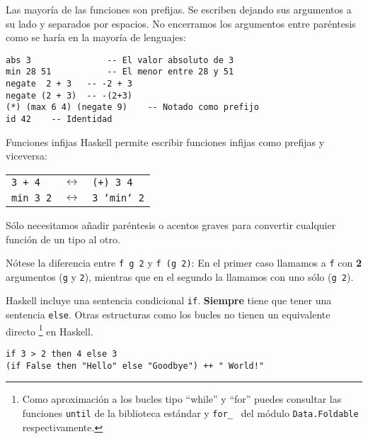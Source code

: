 Las mayoría de las funciones son prefijas. Se escriben dejando sus argumentos a
su lado y separados por espacios. No encerramos los argumentos entre paréntesis
como se haría en la mayoría de lenguajes:

\begin{lstlisting}
abs 3				-- El valor absoluto de 3
min 28 51			-- El menor entre 28 y 51
negate  2 + 3   -- -2 + 3
negate (2 + 3)  -- -(2+3)
(*) (max 6 4) (negate 9)	-- Notado como prefijo
id 42	 -- Identidad
\end{lstlisting}

\begin{extra}{Funciones infijas}
Haskell permite escribir funciones infijas como prefijas y viceversa:

\espacio

\begin{tabular}{lcl}
  \texttt{3 + 4} & $\longleftrightarrow$ & \texttt{(+) 3 4} \\
  \texttt{min 3 2} & $\longleftrightarrow$ & \texttt{3 `min` 2}\\
\end{tabular}

\espacio

Sólo necesitamos añadir paréntesis o acentos graves para convertir
cualquier función de un tipo al otro.
\end{extra}

Nótese la diferencia entre \texttt{f g 2} y \texttt{f (g 2)}: En el primer caso
llamamos a \texttt{f} con \textbf{2} argumentos (\texttt{g} y \texttt{2}), mientras
que en el segundo la llamamos con uno sólo (\texttt{g 2}).

Haskell incluye una sentencia condicional \texttt{if}.
\textbf{Siempre} tiene que tener una sentencia \texttt{else}.
Otras estructuras como los bucles no tienen un equivalente directo \footnote{Como aproximación a los bucles tipo ``while'' y ``for'' puedes consultar las funciones \texttt{until} de la biblioteca estándar y \texttt{for\_ } del módulo \texttt{Data.Foldable} respectivamente.} en Haskell.

\begin{lstlisting}
if 3 > 2 then 4 else 3
(if False then "Hello" else "Goodbye") ++ " World!"
\end{lstlisting}

\newpage
